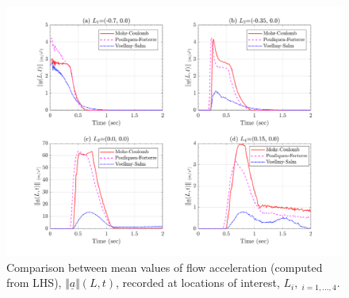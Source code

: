 \documentclass{article}
\begin{document}
\begin{figure}[H]
        \centering
        \includegraphics[width=1\textwidth]{InclinedPlane/LocalRecords/Records/accel_meanL.png}
        \caption{Comparison between mean values of flow acceleration (computed from LHS), $\Vert \underline{a} \Vert(L,t)$, recorded at locations of interest, $L_i, \ _{i=1,...,4}$.}
        \label{fig:Ramp-LM-AccL-means}
\end{figure}
\end{document}

